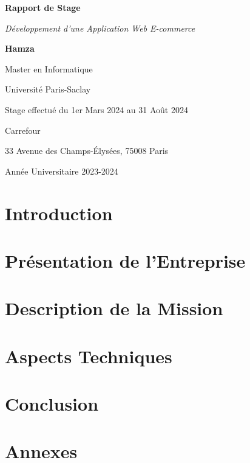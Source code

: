 \documentclass[12pt,a4paper]{report}
\begin{document}
\begin{titlepage}
    \centering
    \vspace*{1cm}
    {\Huge\bfseries Rapport de Stage\par}
    \vspace{2cm}
    {\Large\itshape Développement d'une Application Web E-commerce\par}
    \vspace{2cm}
    {\Large\bfseries Hamza\par}
    \vspace{1cm}
    {\large Master en Informatique\par}
    \vspace{1cm}
    {\large Université Paris-Saclay\par}
    \vspace{2cm}
    {\large Stage effectué du 1er Mars 2024 au 31 Août 2024\par}
    \vspace{2cm}
    {\large Carrefour\par}
    {\large 33 Avenue des Champs-Élysées, 75008 Paris\par}
    \vspace{2cm}
    {\large Année Universitaire 2023-2024\par}
\end{titlepage}

\tableofcontents
\newpage

\chapter{Introduction}


\chapter{Présentation de l'Entreprise}


\chapter{Description de la Mission}


\chapter{Aspects Techniques}


\chapter{Conclusion}





\appendix
\chapter{Annexes}

\end{document}
